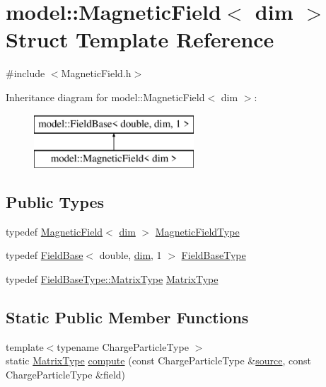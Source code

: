 \hypertarget{structmodel_1_1_magnetic_field}{}\section{model\+:\+:Magnetic\+Field$<$ dim $>$ Struct Template Reference}
\label{structmodel_1_1_magnetic_field}


{\ttfamily \#include $<$Magnetic\+Field.\+h$>$}

Inheritance diagram for model\+:\+:Magnetic\+Field$<$ dim $>$\+:\begin{figure}[H]
\begin{center}
\leavevmode
\includegraphics[height=2.000000cm]{structmodel_1_1_magnetic_field}
\end{center}
\end{figure}
\subsection*{Public Types}
\begin{DoxyCompactItemize}
\item 
typedef \hyperlink{structmodel_1_1_magnetic_field}{Magnetic\+Field}$<$ \hyperlink{plot_nd_a_8m_a382f3ca768b275b8d563604f7fc7df73}{dim} $>$ \hyperlink{structmodel_1_1_magnetic_field_a1cd3f6036181c21543770f22c8218434}{Magnetic\+Field\+Type}
\item 
typedef \hyperlink{structmodel_1_1_field_base}{Field\+Base}$<$ double, \hyperlink{plot_nd_a_8m_a382f3ca768b275b8d563604f7fc7df73}{dim}, 1 $>$ \hyperlink{structmodel_1_1_magnetic_field_a641ae50a036729cdae6471a3a7b91219}{Field\+Base\+Type}
\item 
typedef \hyperlink{structmodel_1_1_field_base_a2a46afe1dafac6e3d1c95d32fc9a58a3}{Field\+Base\+Type\+::\+Matrix\+Type} \hyperlink{structmodel_1_1_magnetic_field_a4efc855c317921e43f0db1d2a7e0f29a}{Matrix\+Type}
\end{DoxyCompactItemize}
\subsection*{Static Public Member Functions}
\begin{DoxyCompactItemize}
\item 
{\footnotesize template$<$typename Charge\+Particle\+Type $>$ }\\static \hyperlink{structmodel_1_1_magnetic_field_a4efc855c317921e43f0db1d2a7e0f29a}{Matrix\+Type} \hyperlink{structmodel_1_1_magnetic_field_a38503d367e6dddd5a9a5a552a6437c59}{compute} (const Charge\+Particle\+Type \&\hyperlink{plot_network_8m_a6f3223812eea666f1fee426db5c8c563}{source}, const Charge\+Particle\+Type \&field)
\end{DoxyCompactItemize}


